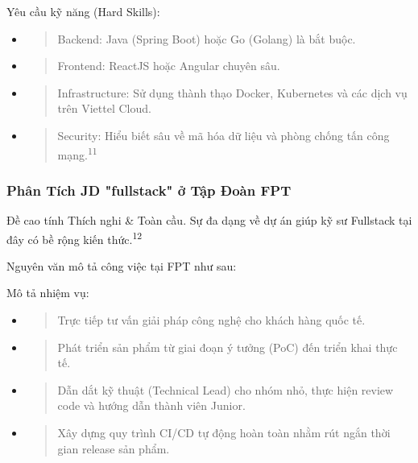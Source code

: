 \documentclass[12pt,a4paper]{article}
\begin{document}
Yêu cầu kỹ năng (Hard Skills):
\begin{itemize}
\item
  \begin{quote}
  Backend: Java (Spring Boot) hoặc Go (Golang) là bắt buộc.
  \end{quote}
\item
  \begin{quote}
  Frontend: ReactJS hoặc Angular chuyên sâu.
  \end{quote}
\item
  \begin{quote}
  Infrastructure: Sử dụng thành thạo Docker, Kubernetes và các dịch vụ trên Viettel Cloud.
  \end{quote}
\item
  \begin{quote}
  Security: Hiểu biết sâu về mã hóa dữ liệu và phòng chống tấn công mạng.\textsuperscript{11}
  \end{quote}
\end{itemize}

\subsubsection{Phân Tích JD "fullstack" ở Tập Đoàn FPT}

Đề cao tính Thích nghi \& Toàn cầu. Sự đa dạng về dự án giúp kỹ sư Fullstack tại đây có bề rộng kiến thức.\textsuperscript{12}

Nguyên văn mô tả công việc tại FPT như sau:

Mô tả nhiệm vụ:
\begin{itemize}
\item
  \begin{quote}
  Trực tiếp tư vấn giải pháp công nghệ cho khách hàng quốc tế.
  \end{quote}
\item
  \begin{quote}
  Phát triển sản phẩm từ giai đoạn ý tưởng (PoC) đến triển khai thực tế.
  \end{quote}
\item
  \begin{quote}
  Dẫn dắt kỹ thuật (Technical Lead) cho nhóm nhỏ, thực hiện review code và hướng dẫn thành viên Junior.
  \end{quote}
\item
  \begin{quote}
  Xây dựng quy trình CI/CD tự động hoàn toàn nhằm rút ngắn thời gian release sản phẩm.
  \end{quote}
\end{itemize}
\end{document}
